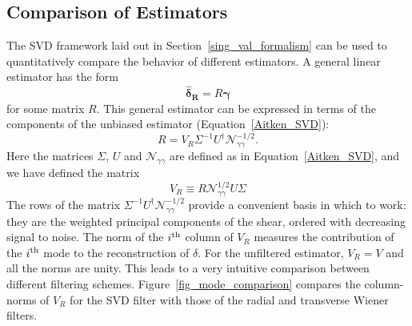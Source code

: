 \documentclass[twocolumn]{emulateapj}
\newcommand{\myvec}[1]{\boldsymbol{#1}}
\newcommand{\mymat}[1]{#1}
\begin{document}
\subsection{Comparison of Estimators}
\label{Comparison}

The SVD framework laid out in Section~\ref{sing_val_formalism} can be used
to quantitatively compare the behavior of different estimators.  A general
linear estimator has the form
\begin{equation}
  \myvec{\hat\delta_R} = \mymat{R}\myvec\gamma
\end{equation}
for some matrix $\mymat{R}$.
This general estimator can be expressed in terms of the components of
the unbiased estimator (Equation~\ref{Aitken_SVD}):
\begin{equation}
  \mymat{R} = \mymat{V_R} \mymat{\Sigma}^{-1} 
  \mymat{U}^\dagger \mymat{\mathcal{N}_{\gamma\gamma}}^{-1/2}.
\end{equation}
Here the matrices $\mymat\Sigma$, $\mymat{U}$ and 
$\mymat{\mathcal{N}_{\gamma\gamma}}$ are defined as in 
Equation~\ref{Aitken_SVD}, and we have defined the matrix
\begin{equation}
  \mymat{V_R} \equiv \mymat{R}\mymat{\mathcal{N}_{\gamma\gamma}}^{1/2}
  \mymat{U}\mymat{\Sigma}
\end{equation}
The rows of the matrix $\mymat{\Sigma}^{-1} \mymat{U}^\dagger 
\mymat{\mathcal{N}_{\gamma\gamma}}^{-1/2}$ provide a convenient basis
in which to work: they are the weighted principal components of the shear, 
ordered with decreasing signal to noise.  The norm of
the $i^{\rm th}$ column of $\mymat{V_R}$ measures the contribution of
the $i^{\rm th}$ mode to the reconstruction of $\delta$.  For the unfiltered
estimator, $\mymat{V_R}=\mymat{V}$ and all the norms are unity.
This leads to a very intuitive comparison between different filtering schemes.
Figure~\ref{fig_mode_comparison} compares the column-norms of $V_R$ 
for the SVD filter with those of the radial and
transverse Wiener filters.
  
\end{document}
